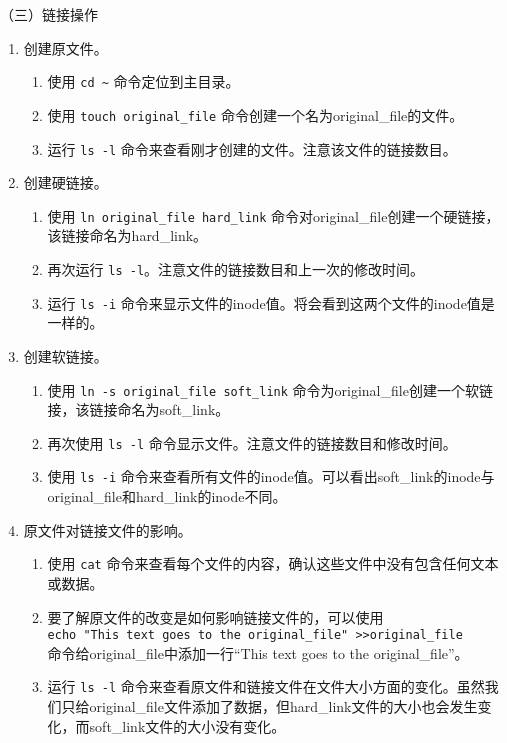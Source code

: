 \vspace{0.1in}
（三）链接操作
\begin{enumerate}
  \item 创建原文件。
    \begin{enumerate}
      \item 使用 \verb|cd ~| 命令定位到主目录。
      \item 使用 \verb|touch original_file| 命令创建一个名为original\_file的文件。
      \item 运行 \verb|ls -l| 命令来查看刚才创建的文件。注意该文件的链接数目。
    \end{enumerate}
  \item 创建硬链接。
    \begin{enumerate}
      \item 使用 \verb|ln original_file hard_link| 命令对original\_file创建一个硬链接，该链接命名为hard\_link。
      \item 再次运行 \verb|ls -l|。注意文件的链接数目和上一次的修改时间。
      \item 运行 \verb|ls -i| 命令来显示文件的inode值。将会看到这两个文件的inode值是一样的。
    \end{enumerate}
  \item 创建软链接。
    \begin{enumerate}
      \item 使用 \verb|ln -s original_file soft_link| 命令为original\_file创建一个软链接，该链接命名为soft\_link。
      \item 再次使用 \verb|ls -l| 命令显示文件。注意文件的链接数目和修改时间。
      \item 使用 \verb|ls -i| 命令来查看所有文件的inode值。可以看出soft\_link的inode与original\_file和hard\_link的inode不同。
    \end{enumerate}
  \item 原文件对链接文件的影响。
    \begin{enumerate}
      \item 使用 \verb|cat| 命令来查看每个文件的内容，确认这些文件中没有包含任何文本或数据。
      \item 要了解原文件的改变是如何影响链接文件的，可以使用\\ \verb|echo "This text goes to the original_file" >>original_file| \\ 命令给original\_file中添加一行“This text goes to the original\_file”。
      \item 运行 \verb|ls -l| 命令来查看原文件和链接文件在文件大小方面的变化。虽然我们只给original\_file文件添加了数据，但hard\_link文件的大小也会发生变化，而soft\_link文件的大小没有变化。

\end{enumerate}
\end{enumerate}
